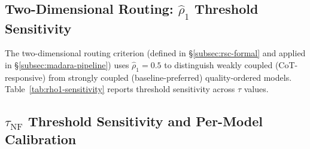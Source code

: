 \documentclass[11pt]{article}
\theoremstyle{definition}
\begin{document}
\subsection{Two-Dimensional Routing: \texorpdfstring{$\hat{\rho}_1$}{rho-hat-1} Threshold Sensitivity}
\label{sec:appendix-rho1-sensitivity}

The two-dimensional routing criterion (defined in \S\ref{subsec:rsc-formal} and applied in \S\ref{subsec:madara-pipeline}) uses \(\hat{\rho}_1 = 0.5\) to distinguish weakly coupled (CoT-responsive) from strongly coupled (baseline-preferred) quality-ordered models. Table~\ref{tab:rho1-sensitivity} reports threshold sensitivity across \(\tau\) values.

\begin{table}[htb]
\centering
{}
\caption{\textbf{\(\hat{\rho}_1\) threshold sensitivity on CFL + FVR (10 pairs).} The routing is highly robust across \(\tau \in [0.4, 0.6]\), achieving minimal performance gap (\(\leq 0.07\)pp). The chosen \(\tau=0.5\) sits safely in the center of this plateau. At \(\tau=0.8\), performance degrades significantly as strongly coupled models (e.g., Llama-CFL) are misrouted to CoT. \(^\dagger\)Number of Quality-Ordered models routed to CoT (vs.\ default baseline).}
\label{tab:rho1-sensitivity}
\end{table}

\subsection{\texorpdfstring{$\tau_{\text{NF}}$}{tau-NF} Threshold Sensitivity and Per-Model Calibration}
\label{sec:appendix-tau-sensitivity}
\end{document}
